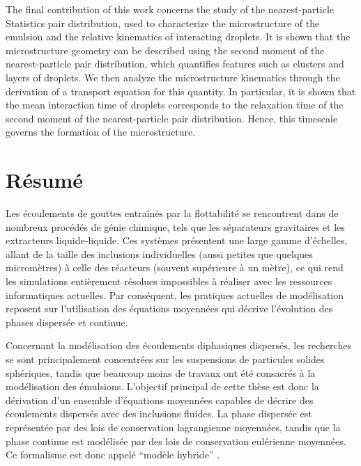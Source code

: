 The final contribution of this work concerns the study of the nearest-particle Statistics pair distribution, used to characterize the microstructure of the emulsion and the relative kinematics of interacting droplets.
It is shown that the microstructure geometry can be described using the second moment of the nearest-particle pair distribution, which quantifies features such as clusters and layers of droplets.
We then analyze the microstructure kinematics through the derivation of a transport equation for this quantity.
In particular, it is shown that the mean interaction time of droplets corresponds to the relaxation time of the second moment of the nearest-particle pair distribution. 
Hence, this timescale governs the formation of the microstructure.




\newpage
\chapter*{\centering R\'esum\'e}

Les \'ecoulements de gouttes entraîn\'es par la flottabilit\'e se rencontrent dans de nombreux proc\'ed\'es de g\'enie chimique, tels que les séparateurs gravitaires et les extracteurs liquide-liquide.
Ces syst\`emes pr\'esentent une large gamme d'\'echelles, allant de la taille des inclusions individuelles (aussi petites que quelques microm\`etres) \`a celle des r\'eacteurs (souvent sup\'erieure \`a un m\`etre), ce qui rend les simulations enti\`erement r\'esolues impossibles \`a r\'ealiser avec les ressources informatiques actuelles.
Par cons\'equent, les pratiques actuelles de mod\'elisation reposent sur l'utilisation des \'equations moyenn\'ees qui d\'ecrive l'\'evolution des phases dispers\'ee et continue.


Concernant la mod\'elisation des \'ecoulements diphasiques dispers\'es, les recherches se sont principalement concentr\'ees sur les suspensions de particules solides sph\'eriques, tandis que beaucoup moins de travaux ont \'et\'e consacr\'es \`a la mod\'elisation des \'emulsions.
L'objectif principal de cette th\`ese est donc la d\'erivation d'un ensemble d'\'equations moyenn\'ees capables de d\'ecrire des \'ecoulements dispers\'es avec des inclusions fluides. %
La phase dispers\'ee est repr\'esent\'ee par des lois de conservation lagrangienne moyenn\'ees, tandis que la phase continue est mod\'elis\'ee par des lois de conservation eul\'erienne moyenn\'ees.
Ce formalisme est donc appel\'e  ``mod\`ele hybride'' .

